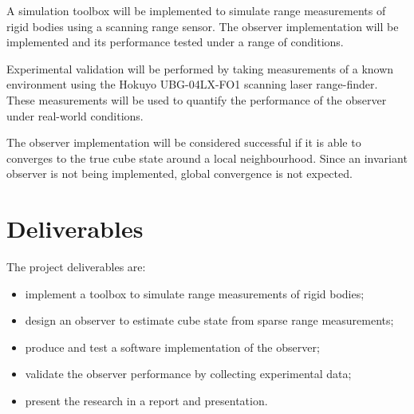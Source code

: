 A simulation toolbox will be implemented to simulate range measurements of rigid bodies using a scanning range sensor. The observer implementation will be implemented and its performance tested under a range of conditions. 

Experimental validation will be performed by taking measurements of a known environment using the Hokuyo UBG-04LX-FO1 scanning laser range-finder. These measurements will be used to quantify the performance of the observer under real-world conditions.

The observer implementation will be considered successful if it is able to converges to the true cube state around a local neighbourhood. Since an invariant observer is not being implemented, global convergence is not expected.

\section{Deliverables}
The project deliverables are:
\begin{itemize}
\item implement a toolbox to simulate range measurements of rigid bodies;
\item design an observer to estimate cube state from sparse range measurements;
\item produce and test a software implementation of the observer;
\item validate the observer performance by collecting experimental data;
\item present the research in a report and presentation.
\end{itemize}
